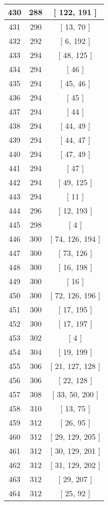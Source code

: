 \begin{center}
\begin{longtable}[H]{|| c c c ||}
\hline
430 & 288 & [ 122, 191 ] \\ 
\hline
431 & 290 & [ 13, 70 ] \\ 
\hline
432 & 292 & [ 6, 192 ] \\ 
\hline
433 & 294 & [ 48, 125 ] \\ 
\hline
434 & 294 & [ 46 ] \\ 
\hline
435 & 294 & [ 45, 46 ] \\ 
\hline
436 & 294 & [ 45 ] \\ 
\hline
437 & 294 & [ 44 ] \\ 
\hline
438 & 294 & [ 44, 49 ] \\ 
\hline
439 & 294 & [ 44, 47 ] \\ 
\hline
440 & 294 & [ 47, 49 ] \\ 
\hline
441 & 294 & [ 47 ] \\ 
\hline
442 & 294 & [ 49, 125 ] \\ 
\hline
443 & 294 & [ 11 ] \\ 
\hline
444 & 296 & [ 12, 193 ] \\ 
\hline
445 & 298 & [ 4 ] \\ 
\hline
446 & 300 & [ 74, 126, 194 ] \\ 
\hline
447 & 300 & [ 73, 126 ] \\ 
\hline
448 & 300 & [ 16, 198 ] \\ 
\hline
449 & 300 & [ 16 ] \\ 
\hline
450 & 300 & [ 72, 126, 196 ] \\ 
\hline
451 & 300 & [ 17, 195 ] \\ 
\hline
452 & 300 & [ 17, 197 ] \\ 
\hline
453 & 302 & [ 4 ] \\ 
\hline
454 & 304 & [ 19, 199 ] \\ 
\hline
455 & 306 & [ 21, 127, 128 ] \\ 
\hline
456 & 306 & [ 22, 128 ] \\ 
\hline
457 & 308 & [ 33, 50, 200 ] \\ 
\hline
458 & 310 & [ 13, 75 ] \\ 
\hline
459 & 312 & [ 26, 95 ] \\ 
\hline
460 & 312 & [ 29, 129, 205 ] \\ 
\hline
461 & 312 & [ 30, 129, 201 ] \\ 
\hline
462 & 312 & [ 31, 129, 202 ] \\ 
\hline
463 & 312 & [ 29, 207 ] \\ 
\hline
464 & 312 & [ 25, 92 ] \\ 

\end{longtable}
\end{center}
